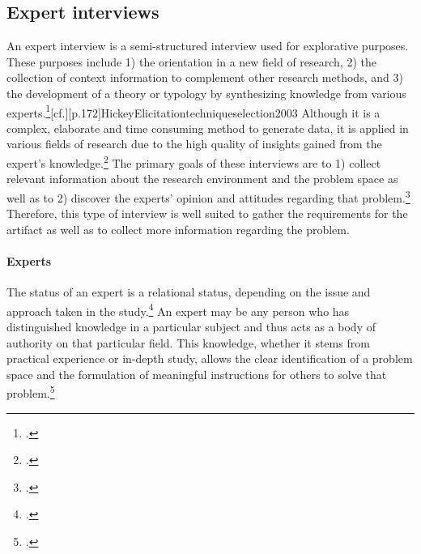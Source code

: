 \subsection{Expert interviews} \label{subsec:ExpertInterviews}
An expert interview is a semi-structured interview used for explorative purposes. These purposes include 1) the orientation in a new field of research, 2) the collection of context information to complement other research methods, and 3) the development of a theory or typology by synthesizing knowledge from various experts.\footcite[Cf.][p.450]{PfadenhauerExperteninterviewGesprachauf2007}[cf.][p.172]{HickeyElicitationtechniqueselection2003} Although it is a complex, elaborate and time consuming method to generate data, it is applied in various fields of research due to the high quality of insights gained from the expert's knowledge.\footcites[Cf.][p.459]{PfadenhauerExperteninterviewGesprachauf2007}[cf.][p.442]{MeuserExpertInneninterviewsvielfacherprobt1991}[cf.][p.424]{BuberQualitativeMarktforschungKonzepte2007}[cf.][p.179]{Flickintroductionqualitativeresearch2009}[cf.][p.465]{MeuserExperteninterviewkonzeptionelleGrundlagen2009}[cf.][p.31]{BognerInterviewsmitExperten2014}
The primary goals of these interviews are to 1) collect relevant information about the research environment and the problem space as well as to 2) discover the experts' opinion and attitudes regarding that problem.\footcite[Cf.][p.28 et seq]{BognerInterviewsmitExperten2014} Therefore, this type of interview is well suited to gather the requirements for the artifact as well as to collect more information regarding the problem.

\paragraph{Experts} The status of an expert is a relational status, depending on the issue and approach taken in the study.\footcites[Cf.][p.179]{Flickintroductionqualitativeresearch2009}[cf.][p.444]{MeuserExpertInneninterviewsvielfacherprobt1991} An expert may be any person who has distinguished knowledge in a particular subject and thus acts as a body of authority on that particular field. This knowledge, whether it stems from practical experience or in-depth study, allows the clear identification of a problem space and the formulation of meaningful instructions for others to solve that problem.\footcites[Cf.][p.469]{MeuserExpertInneninterviewsvielfacherprobt1991}[cf.][p.467]{MeuserExperteninterviewkonzeptionelleGrundlagen2009}[cf.][p.179]{Flickintroductionqualitativeresearch2009}[cf.][p.451]{PfadenhauerExperteninterviewGesprachauf2007}[cf.][p.19]{BognerInterviewsmitExperten2014}

